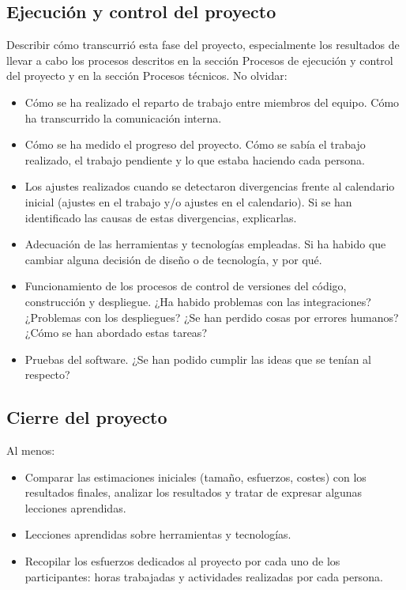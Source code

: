 \documentclass[12pt]{article}%
\begin{document}
\subsection{Ejecuci\'on y control del proyecto}
Describir c\'omo transcurri\'o esta fase del proyecto, especialmente los resultados de llevar a cabo los procesos descritos en la secci\'on Procesos de ejecuci\'on y control del proyecto y en la secci\'on Procesos t\'ecnicos. No olvidar:
\begin{itemize}
	\item C\'omo se ha realizado el reparto de trabajo entre miembros del equipo. C\'omo ha transcurrido la comunicaci\'on interna.
	\item C\'omo se ha medido el progreso del proyecto. C\'omo se sab\'ia el trabajo realizado, el trabajo pendiente y lo que estaba haciendo cada persona.
	\item Los ajustes realizados cuando se detectaron divergencias frente al calendario inicial (ajustes en el trabajo y/o ajustes en el calendario). Si se han identificado las causas de estas divergencias, explicarlas.
	\item Adecuaci\'on de las herramientas y tecnolog\'ias empleadas. Si ha habido que cambiar alguna decisi\'on de diseño o de tecnolog\'ia, y por qu\'e.
	\item Funcionamiento de los procesos de control de versiones del c\'odigo, construcci\'on y despliegue. ¿Ha habido problemas con las integraciones? ¿Problemas con los despliegues? ¿Se han perdido cosas por errores humanos? ¿C\'omo se han abordado estas tareas?
	\item Pruebas del software. ¿Se han podido cumplir las ideas que se ten\'ian al respecto?
\end{itemize}

\subsection{Cierre del proyecto}
Al menos:
\begin{itemize}
	\item Comparar las estimaciones iniciales (tamaño, esfuerzos, costes) con los resultados finales, analizar los resultados y tratar de expresar algunas lecciones aprendidas.
	\item Lecciones aprendidas sobre herramientas y tecnolog\'ias.
	\item Recopilar los esfuerzos dedicados al proyecto por cada uno de los participantes: horas trabajadas y actividades realizadas por cada persona.
\end{itemize}
\end{document}
